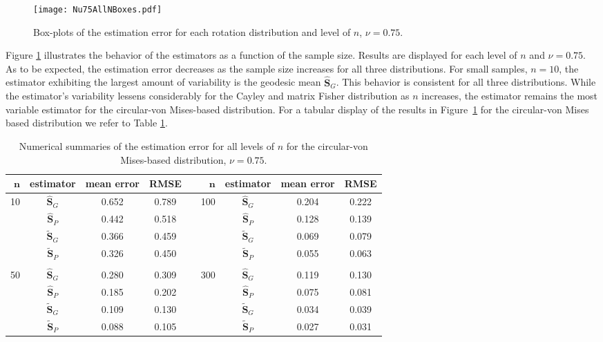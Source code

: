 \begin{figure}[h!]
\centering
\texttt{[image: Nu75AllNBoxes.pdf]}
\caption{Box-plots of the estimation error for each rotation distribution and level of $n$,  $\nu=0.75$.}
\label{fig:NBoxes}
\end{figure}

\noindent Figure \ref{fig:NBoxes} illustrates the behavior of the estimators as a function of the sample size. Results are displayed for each level of $n$ and  $\nu=0.75$. As to be expected, the estimation error decreases as the sample size increases for all three distributions. For small samples, $n=10$, the estimator exhibiting the largest amount of variability is the geodesic mean $\widehat{\bm S}_G$. This behavior is consistent for all three distributions.  While the estimator's variability lessens considerably for the Cayley and matrix Fisher distribution as $n$ increases, the estimator remains the most variable estimator for the circular-von Mises-based distribution.   For a tabular display of the results in Figure~\ref{fig:NBoxes} for the circular-von Mises based distribution we refer to Table \ref{tab:vmnu75}.  

\begin{table}[h!]
\caption{Numerical summaries of the estimation error for all levels of $n$ for the circular-von Mises-based distribution,  $\nu=0.75$.  \label{tab:vmnu75}}
\begin{center}
\begin{tabular}{rccccrccc}
  \hline
 $\mathbf{n}$ & \textbf{estimator}  & \textbf{mean error} & \textbf{RMSE} & &$\mathbf{n}$ & \textbf{estimator} & \textbf{mean error} & \textbf{RMSE} \\ \hline \hline
   \multirow{4}{*}{10} & $\widehat{\bm S}_{G}$  & 0.652 & 0.789 &  & \multirow{4}{*}{100} & $\widehat{\bm S}_{G}$  & 0.204 & 0.222 \\ 
    & $\widehat{\bm S}_{P}$  & 0.442 & 0.518 &   & & $\widehat{\bm S}_{P}$ & 0.128 & 0.139 \\ 
    & $\widetilde{\bm S}_{G}$  & 0.366 & 0.459 &  &  & $\widetilde{\bm S}_{G}$  & 0.069 & 0.079 \\ 
    & $\widetilde{\bm S}_{P}$  & 0.326 & 0.450 &   & & $\widetilde{\bm S}_{P}$  & 0.055 & 0.063 \\  
    & & & & & & & \\ 
    \multirow{4}{*}{50} & $\widehat{\bm S}_{G}$  & 0.280 & 0.309 &  &  \multirow{4}{*}{300} & $\widehat{\bm S}_{G}$  & 0.119 & 0.130 \\ 
    & $\widehat{\bm S}_{P}$  & 0.185 & 0.202 &  &  & $\widehat{\bm S}_{P}$  & 0.075 & 0.081 \\ 
    & $\widetilde{\bm S}_{G}$  & 0.109 & 0.130 &  & & $\widetilde{\bm S}_{G}$  & 0.034 & 0.039 \\
    & $\widetilde{\bm S}_{P}$ & 0.088 & 0.105 &  &  & $\widetilde{\bm S}_{P}$ & 0.027 & 0.031 \\ 
   \hline
\end{tabular}
\end{center}
\end{table}

